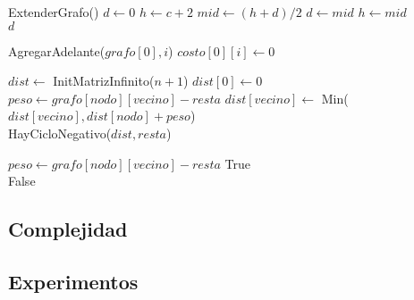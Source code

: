 \begin{algorithm}[H]
\begin{algorithmic}
	\State ExtenderGrafo()
    \State $d \gets 0$
	\State $h \gets c + 2$
		\State $mid \gets (h + d)/2$
			\State $d \gets mid$
		\Else
			\State $h \gets mid$ \\
		\EndIf
	\EndWhile
	\Return $d$
\EndFunction
\end{algorithmic}
\end{algorithm}

\begin{algorithm}[H]
\begin{algorithmic}
	\For{$i \in [1..n)$}
		\State AgregarAdelante($grafo[0], i$)
		\State $costo[0][i] \gets 0$
	\EndFor
\EndFunction
\end{algorithmic}
\end{algorithm}

\begin{algorithm}[H]
\begin{algorithmic}
	\State $dist \gets$ InitMatrizInfinito($n + 1$)
	\State $dist[0] \gets 0$
	\For{$i \in [1..n)$}
				\State $peso \gets grafo[nodo][vecino] - resta$
				\State $dist[vecino] \gets$ Min($dist[vecino], dist[nodo] + peso$) \\
			\EndFor
		\EndFor
	\EndFor
	\Return HayCicloNegativo($dist, resta$)
\EndFunction
\end{algorithmic}
\end{algorithm}

\begin{algorithm}[H]
\begin{algorithmic}
			\State $peso \gets grafo[nodo][vecino] - resta$
				\State \Return True \\
			\EndIf
		\EndFor
	\EndFor
	\Return False
\EndFunction
\end{algorithmic}
\end{algorithm}

\newpage

\subsection{Complejidad}

\subsection{Experimentos}